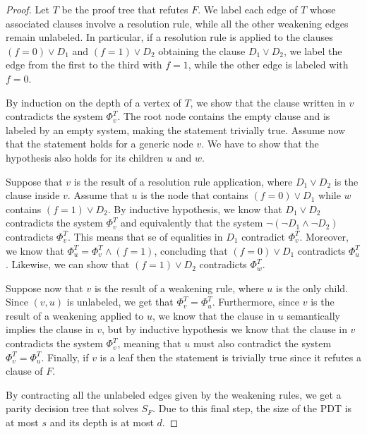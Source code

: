 \begin{proof}
    Let $T$ be the proof tree that refutes $F$. We label each edge of $T$ whose associated clauses involve a resolution rule, while all the other weakening edges remain unlabeled. In particular, if a resolution rule is applied to the clauses $(f = 0) \lor D_1$ and $(f = 1) \lor D_2$ obtaining the clause $D_1 \lor D_2$, we label the edge from the first to the third with $f = 1$, while the other edge is labeled with $f = 0$.

    By induction on the depth of a vertex of $T$, we show that the clause written in $v$ contradicts the system $\Phi_v^T$. The root node contains the empty clause and is labeled by an empty system, making the statement trivially true. Assume now that the statement holds for a generic node $v$. We have to show that the hypothesis also holds for its children $u$ and $w$.

    Suppose that $v$ is the result of a resolution rule application, where $D_1 \lor D_2$ is the clause inside $v$. Assume that $u$ is the node that contains $(f = 0) \lor D_1$ while $w$ contains $(f = 1) \lor D_2$. By inductive hypothesis, we know that $D_1 \lor D_2$ contradicts the system $\Phi_v^T$ and equivalently that the system $\lnot (\lnot D_1 \land \lnot D_2)$ contradicts $\Phi_v^T$. This means that se of equalities in $D_1$ contradict $\Phi_v^T$. Moreover, we know that $\Phi_u^T = \Phi_v^T \land (f = 1)$, concluding that $(f = 0) \lor D_1$ contradicts $\Phi_u^T$. Likewise, we can show that $(f = 1) \lor D_2$ contradicts $\Phi_w^T$.
    
    Suppose now that $v$ is the result of a weakening rule, where $u$ is the only child. Since $(v,u)$ is unlabeled, we get that $\Phi_v^T = \Phi_u^T$. Furthermore, since $v$ is the result of a weakening applied to $u$, we know that the clause in $u$ semantically implies the clause in $v$, but by inductive hypothesis we know that the clause in $v$ contradicts the system $\Phi_v^T$, meaning that $u$ must also contradict the system $\Phi_v^T = \Phi_u^T$. Finally, if $v$ is a leaf then the statement is trivially true since it refutes a clause of $F$.

    By contracting all the unlabeled edges given by the weakening rules, we get a parity decision tree that solves $S_F$. Due to this final step, the size of the PDT is at most $s$ and its depth is at most $d$. 
\end{proof}

